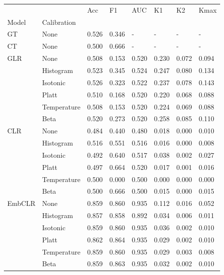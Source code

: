 \begin{tabular}{llllllll}
\toprule
 &  & Acc & F1 & AUC & K1 & K2 & Kmax \\
Model & Calibration &  &  &  &  &  &  \\
\midrule
GT & None & 0.526 & 0.346 & - & - & - & - \\
\cline{1-8}
CT & None & 0.500 & 0.666 & - & - & - & - \\
\cline{1-8}
\multirow[t]{6}{*}{GLR} & None & 0.508 & 0.153 & 0.520 & 0.230 & 0.072 & 0.094 \\
 & Histogram & 0.523 & 0.345 & 0.524 & 0.247 & 0.080 & 0.134 \\
 & Isotonic & 0.526 & 0.323 & 0.522 & 0.237 & 0.078 & 0.143 \\
 & Platt & 0.510 & 0.168 & 0.520 & 0.220 & 0.068 & 0.088 \\
 & Temperature & 0.508 & 0.153 & 0.520 & 0.224 & 0.069 & 0.088 \\
 & Beta & 0.520 & 0.273 & 0.520 & 0.258 & 0.085 & 0.110 \\
\cline{1-8}
\multirow[t]{6}{*}{CLR} & None & 0.484 & 0.440 & 0.480 & 0.018 & 0.000 & 0.010 \\
 & Histogram & 0.516 & 0.551 & 0.516 & 0.016 & 0.000 & 0.008 \\
 & Isotonic & 0.492 & 0.640 & 0.517 & 0.038 & 0.002 & 0.027 \\
 & Platt & 0.497 & 0.664 & 0.520 & 0.017 & 0.001 & 0.016 \\
 & Temperature & 0.500 & 0.000 & 0.500 & 0.000 & 0.000 & 0.000 \\
 & Beta & 0.500 & 0.666 & 0.500 & 0.015 & 0.000 & 0.015 \\
\cline{1-8}
\multirow[t]{6}{*}{EmbCLR} & None & 0.859 & 0.860 & 0.935 & 0.112 & 0.016 & 0.052 \\
 & Histogram & 0.857 & 0.858 & 0.892 & 0.034 & 0.006 & 0.011 \\
 & Isotonic & 0.859 & 0.860 & 0.935 & 0.036 & 0.002 & 0.010 \\
 & Platt & 0.862 & 0.864 & 0.935 & 0.029 & 0.002 & 0.010 \\
 & Temperature & 0.859 & 0.860 & 0.935 & 0.029 & 0.003 & 0.008 \\
 & Beta & 0.859 & 0.863 & 0.935 & 0.032 & 0.002 & 0.010 \\
\cline{1-8}
\bottomrule
\end{tabular}

